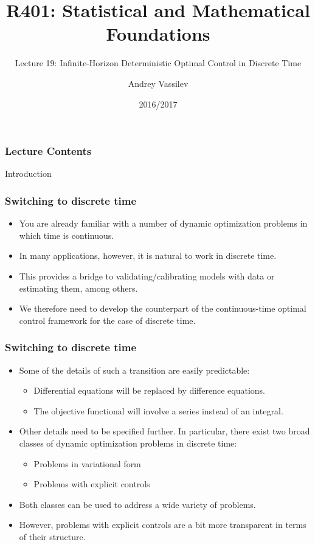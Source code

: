 \documentclass[10pt]{beamer}
\title{R401: Statistical and Mathematical Foundations}
\subtitle{Lecture 19: Infinite-Horizon Deterministic Optimal Control in Discrete Time}
\author{Andrey Vassilev}
\date{2016/2017}
\theoremstyle{definition}
\begin{document}
\maketitle



\begin{frame}[fragile]
\frametitle{Lecture Contents}
\tableofcontents
\end{frame}

\begin{section}{Introduction}\label{sec:intro}

\begin{frame}[fragile]
\frametitle{Switching to discrete time}
\begin{itemize}\itemsep1em
\item You are already familiar with a number of dynamic optimization problems in which time is continuous.
\item In many applications, however, it is natural to work in discrete time.
\item This provides a bridge to validating/calibrating models with data or estimating them, among others.
\item We therefore need to develop the counterpart of the continuous-time optimal control framework for the case of discrete time.
\end{itemize}
\end{frame}

\begin{frame}[fragile]
\frametitle{Switching to discrete time}
\begin{itemize}\itemsep1em
\item Some of the details of such a transition are easily predictable:
	\begin{itemize}
	\item Differential equations will be replaced by difference equations.
	\item The objective functional will involve a series instead of an integral.
	\end{itemize}
\item Other details need to be specified further. In particular, there exist two broad classes of dynamic optimization problems in discrete time:
	\begin{itemize}
	\item Problems in variational form
	\item Problems with explicit controls
	\end{itemize}
\item Both classes can be used to address a wide variety of problems. 
\item However, problems with explicit controls are a bit more transparent in terms of their structure.
\end{itemize}
\end{frame}


\end{section}
\end{document}
